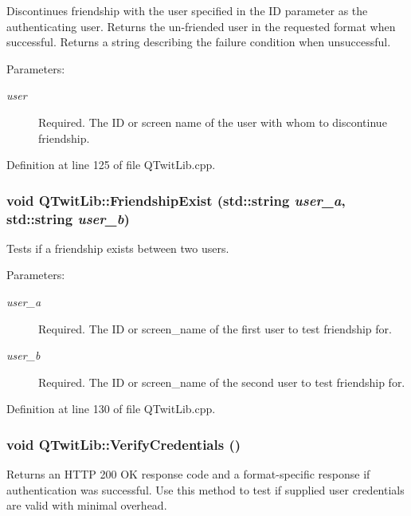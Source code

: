 Discontinues friendship with the user specified in the ID parameter as the authenticating user. Returns the un-friended user in the requested format when successful. Returns a string describing the failure condition when unsuccessful. \begin{Desc}
\item[Parameters:]
\begin{description}
\item[{\em user}]Required. The ID or screen name of the user with whom to discontinue friendship. \end{description}
\end{Desc}


Definition at line 125 of file QTwitLib.cpp.\hypertarget{classQTwitLib_fc32d1e3393877f561c680b680d86730}{
\subsubsection{\setlength{\rightskip}{0pt plus 5cm}void QTwitLib::FriendshipExist (std::string {\em user\_\-a}, \/  std::string {\em user\_\-b})}}
\label{classQTwitLib_fc32d1e3393877f561c680b680d86730}


Tests if a friendship exists between two users. \begin{Desc}
\item[Parameters:]
\begin{description}
\item[{\em user\_\-a}]Required. The ID or screen\_\-name of the first user to test friendship for. \item[{\em user\_\-b}]Required. The ID or screen\_\-name of the second user to test friendship for. \end{description}
\end{Desc}


Definition at line 130 of file QTwitLib.cpp.\hypertarget{classQTwitLib_893a5f44401cd8d82ed7e703ad914bb3}{
\subsubsection{\setlength{\rightskip}{0pt plus 5cm}void QTwitLib::VerifyCredentials ()}}
\label{classQTwitLib_893a5f44401cd8d82ed7e703ad914bb3}


Returns an HTTP 200 OK response code and a format-specific response if authentication was successful. Use this method to test if supplied user credentials are valid with minimal overhead. 

